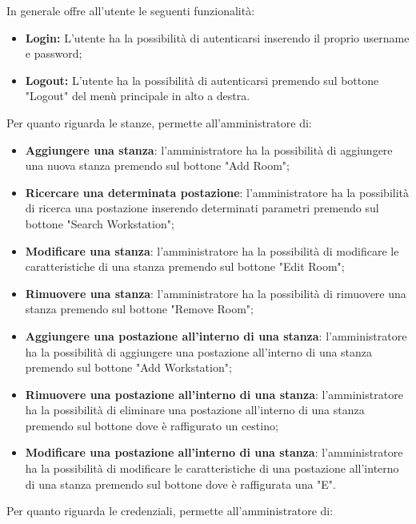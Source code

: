 In generale offre all'utente le seguenti funzionalità:
\begin{itemize}
	\item \textbf{Login:} L'utente ha la possibilità di autenticarsi inserendo il proprio username e password; \\
	\item \textbf{Logout:} L'utente ha la possibilità di autenticarsi premendo sul bottone "Logout" del menù principale in alto a destra. \\
\end{itemize}
Per quanto riguarda le stanze, permette all'amministratore di:
\begin{itemize}
\item \textbf{Aggiungere una stanza}: l'amministratore ha la possibilità di aggiungere una nuova stanza premendo sul bottone "Add Room"; \\
\item \textbf{Ricercare una determinata postazione}: l'amministratore ha la possibilità di ricerca una postazione inserendo determinati parametri premendo sul bottone "Search Workstation"; \\
\item \textbf{Modificare una stanza}: l'amministratore ha la possibilità di modificare le caratteristiche di una stanza premendo sul bottone "Edit Room"; \\
\item \textbf{Rimuovere una stanza}: l'amministratore ha la possibilità di rimuovere una stanza premendo sul bottone "Remove Room"; \\
\item \textbf{Aggiungere una postazione all'interno di una stanza}: l'amministratore ha la possibilità di aggiungere una postazione all'interno di una stanza premendo sul bottone "Add Workstation"; \\
\item \textbf{Rimuovere una postazione all'interno di una stanza}: l'amministratore ha la possibilità di eliminare una postazione all'interno di una stanza premendo sul bottone dove è raffigurato un cestino; \\
\item \textbf{Modificare una postazione all'interno di una stanza}:  l'amministratore ha la possibilità di modificare le caratteristiche di una postazione all'interno di una stanza premendo sul bottone dove è raffigurata una "E". \\
\end{itemize}
Per quanto riguarda le credenziali, permette all'amministratore di:
